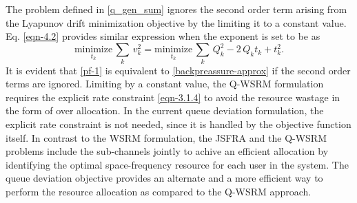 
The problem defined in \eqref{q_gen_sum} ignores the second order term arising from the Lyapunov drift minimization objective by the limiting it to a constant value. Eq. \eqref{eqn-4.2} provides similar expression when the exponent is set to be  as
\begin{equation}\label{pf-1}
\underset{t_k}{\text{minimize}} \, \sum_k \, v_k^2 = \underset{t_k}{\text{minimize}} \, \sum_k \, Q_k^2 - 2 \, Q_k t_k + t_k^2.
\end{equation}
It is evident that \eqref{pf-1} is equivalent to \eqref{backpreassure-approx} if the second order terms are ignored. Limiting  by a constant value, the \ac{Q-WSRM} formulation requires the explicit rate constraint \eqref{eqn-3.1.4} to avoid the resource wastage in the form of over allocation. In the current queue deviation formulation, the explicit rate constraint is not needed, since it is handled by the objective function itself. In contrast to the \ac{WSRM} formulation, the \ac{JSFRA} and the \ac{Q-WSRM} problems include the sub-channels jointly to achive an efficient allocation by identifying the optimal space-frequency resource for each user in the system. The queue deviation objective provides an alternate and a more efficient way to perform the resource allocation as compared to the \ac{Q-WSRM} approach.
